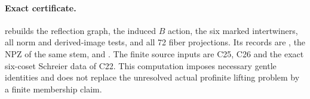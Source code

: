 \paragraph{Exact certificate.}
rebuilds the reflection graph, the induced $B$ action,
the six marked intertwiners, all norm and derived-image
tests, and all 72 fiber projections.  Its records are
,
the NPZ of the same stem, and
.
The finite source inputs are C25, C26 and the exact
six-coset Schreier data of C22.  This computation imposes
necessary gentle identities and does not replace the
unresolved actual profinite lifting problem by a finite
membership claim.
